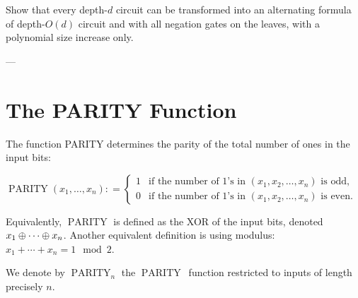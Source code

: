 \begin{exercise}
Show that every depth-$d$ circuit can be transformed into an alternating formula of depth-$O(d)$ circuit and with all negation gates on the leaves, with a polynomial size increase only.

\noindent---

\end{exercise}



\newcommand{\Parity}{\ensuremath{\operatorname{PARITY}}}


\section{The PARITY Function}

The function PARITY determines the parity of the total number of ones in the input bits:

\begin{tcolorbox}[colframe=white, colback=gray!11, boxrule=0mm, sharp corners]
$
\Parity(x_1,\dots,x_n): =
\begin{cases} 
1 & \text{if the number of 1's in } (x_1, x_2, \dots, x_n) \text{ is odd}, \\
0 & \text{if the number of 1's in } (x_1, x_2, \dots, x_n) \text{ is even}.
\end{cases}
$
\end{tcolorbox}

Equivalently, $\Parity$ is defined as the XOR of the input bits, denoted $x_1\oplus\cdots\oplus x_n$. Another equivalent definition is using modulus: $x_1+\cdots+x_n = 1 \mod 2$.

We denote by $\Parity_n$ the \Parity\ function restricted to inputs of length precisely $n$.

